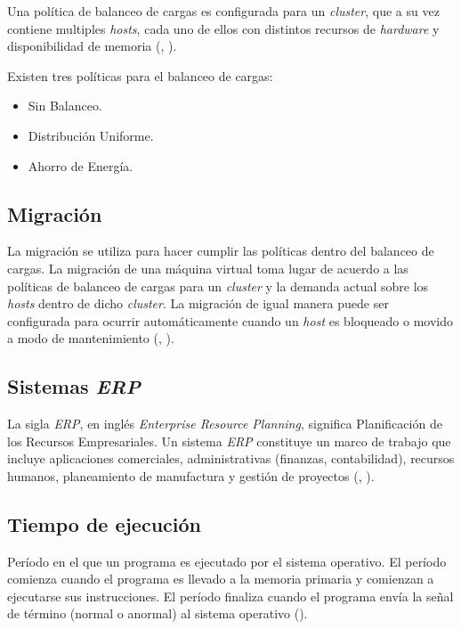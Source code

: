 Una pol\'itica de balanceo de cargas es configurada para un \textit{cluster}, que a su vez contiene multiples \textit{hosts}, cada uno de ellos con distintos recursos de \textit{hardware} y disponibilidad de memoria (\citeauthor{redhat}, \citeyear{redhat}). 


Existen tres pol\'iticas para el balanceo de cargas:
\begin{itemize}
	\item Sin Balanceo.
	\item Distribuci\'on Uniforme.
	\item Ahorro de Energ\'ia.
\end{itemize}

\subsection*{Migraci\'on}

La migraci\'on se utiliza para hacer cumplir las pol\'iticas dentro del balanceo de cargas. La migraci\'on de una m\'aquina virtual toma lugar de acuerdo a las pol\'iticas de balanceo de cargas para un \textit{cluster} y la demanda actual sobre los \textit{hosts} dentro de dicho \textit{cluster}. La migraci\'on de igual manera puede ser configurada para ocurrir autom\'aticamente cuando un \textit{host} es bloqueado o movido a modo de mantenimiento (\citeauthor{redhat}, \citeyear{redhat}).

\subsection*{Sistemas \textit{ERP}}

La sigla \textit{ERP}, en ingl\'es \textit{Enterprise Resource Planning}, significa Planificaci\'on de los Recursos Empresariales. Un sistema \textit{ERP} constituye un marco de trabajo que incluye aplicaciones comerciales, administrativas (finanzas, contabilidad), recursos humanos, planeamiento de manufactura y gesti\'on de proyectos (\citeauthor{saroka2002sistemas}, \citeyear{saroka2002sistemas}). 

\subsection*{Tiempo de ejecución}

Período en el que un programa es ejecutado por el sistema operativo. El período comienza cuando el programa es llevado a la memoria primaria y comienzan a ejecutarse sus instrucciones. El período finaliza cuando el programa envía la señal de término (normal o anormal) al sistema operativo (\cite{redhat}).

